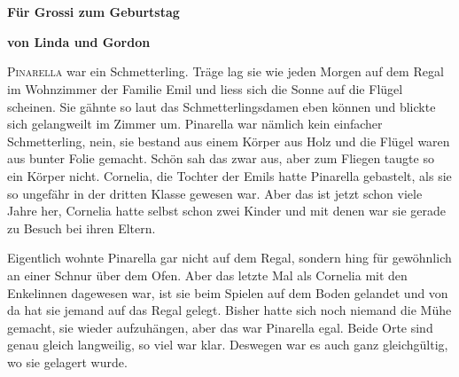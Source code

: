 
\chapter*{}
\centerline{\Huge \color{red}\SixFlowerPetalDotted}
\vspace{20pt}
\centerline{\bf \Large\color{red}Für Grossi zum Geburtstag}
\vspace{20pt}
\centerline{\bf \Large\color{red} von Linda und Gordon}
\vspace{20pt}
\centerline{\huge \color{red}\SixFlowerPetalDotted}
\vspace{20pt}
\centerline{\LARGE \color{red}\SixFlowerPetalDotted}
\vspace{20pt}
\centerline{\Large \color{red}\SixFlowerPetalDotted}
\vspace{20pt}
\centerline{\large \color{red}\SixFlowerPetalDotted}
\vspace{20pt}
\centerline{\normalsize \color{red}\SixFlowerPetalDotted}
\vspace{20pt}
\centerline{\small \color{red}\SixFlowerPetalDotted}
\vspace{20pt}
\centerline{\footnotesize \color{red}\SixFlowerPetalDotted}
\vspace{20pt}
\centerline{\scriptsize \color{red}\SixFlowerPetalDotted}
\vspace{20pt}
\centerline{\tiny \color{red}\SixFlowerPetalDotted}
\newpage
{}


\lettrine[lines=3]{\color{red}P}{inarella} war ein Schmetterling. Träge lag sie wie jeden Morgen auf dem Regal im Wohnzimmer der Familie Emil und liess sich die Sonne auf die Flügel scheinen. Sie gähnte so laut das Schmetterlingsdamen eben können und blickte sich gelangweilt im Zimmer um. Pinarella war nämlich kein einfacher Schmetterling, nein, sie bestand aus einem Körper aus Holz und die Flügel waren aus bunter Folie gemacht. Schön sah das zwar aus, aber zum Fliegen taugte so ein Körper nicht. Cornelia, die Tochter der Emils hatte Pinarella gebastelt, als sie so ungefähr in der dritten Klasse gewesen war. Aber das ist jetzt schon viele Jahre her, Cornelia hatte selbst schon zwei Kinder und mit denen war sie gerade zu Besuch bei ihren Eltern. 

Eigentlich wohnte Pinarella gar nicht auf dem Regal, sondern hing für gewöhnlich an einer Schnur über dem Ofen. Aber das letzte Mal als Cornelia mit den Enkelinnen dagewesen war, ist sie beim Spielen auf dem Boden gelandet und von da hat sie jemand auf das Regal gelegt. Bisher hatte sich noch niemand die Mühe gemacht, sie wieder aufzuhängen, aber das war Pinarella egal. Beide Orte sind genau gleich langweilig, so viel war klar. Deswegen war es auch ganz gleichgültig, wo sie gelagert wurde.


